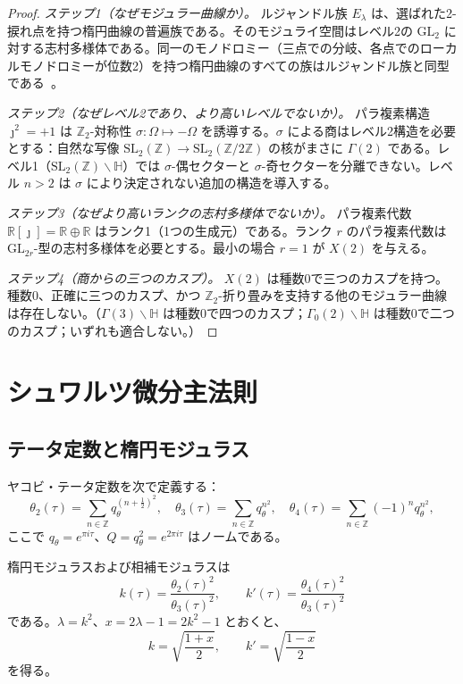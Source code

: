 \documentclass[12pt]{article}
\theoremstyle{plain}
\theoremstyle{definition}
\numberwithin{equation}{section}
\newcommand{\R}{\mathbb{R}}
\newcommand{\Z}{\mathbb{Z}}
\newcommand{\HH}{\mathbb{H}}
\begin{document}
\begin{proof}
\emph{ステップ1（なぜモジュラー曲線か）。} ルジャンドル族 $E_\lambda$ は、選ばれた2-捩れ点を持つ楕円曲線の普遍族である。そのモジュライ空間はレベル2の $\mathrm{GL}_2$ に対する志村多様体である。同一のモノドロミー（三点での分岐、各点でのローカルモノドロミーが位数2）を持つ楕円曲線のすべての族はルジャンドル族と同型である~\cite{Serre}。

\emph{ステップ2（なぜレベル2であり、より高いレベルでないか）。} パラ複素構造 $\jmath^2=+1$ は $\Z_2$-対称性 $\sigma:\Omega\mapsto-\Omega$ を誘導する。$\sigma$ による商はレベル2構造を必要とする：自然な写像 $\mathrm{SL}_2(\Z)\to\mathrm{SL}_2(\Z/2\Z)$ の核がまさに $\Gamma(2)$ である。レベル1（$\mathrm{SL}_2(\Z)\backslash\HH$）では $\sigma$-偶セクターと $\sigma$-奇セクターを分離できない。レベル $n>2$ は $\sigma$ により決定されない追加の構造を導入する。

\emph{ステップ3（なぜより高いランクの志村多様体でないか）。} パラ複素代数 $\R[\jmath]=\R\oplus\R$ はランク1（1つの生成元）である。ランク $r$ のパラ複素代数は $\mathrm{GL}_{2r}$-型の志村多様体を必要とする。最小の場合 $r=1$ が $X(2)$ を与える。

\emph{ステップ4（商からの三つのカスプ）。} $X(2)$ は種数0で三つのカスプを持つ。種数0、正確に三つのカスプ、かつ $\Z_2$-折り畳みを支持する他のモジュラー曲線は存在しない。（$\Gamma(3)\backslash\HH$ は種数0で四つのカスプ；$\Gamma_0(2)\backslash\HH$ は種数0で二つのカスプ；いずれも適合しない。）
\end{proof}

\section{シュワルツ微分主法則}\label{sec:schwarzian}

\subsection{テータ定数と楕円モジュラス}

ヤコビ・テータ定数を次で定義する：
\begin{equation}
\theta_2(\tau) = \sum_{n\in\Z} q_\theta^{(n+\frac{1}{2})^2},\quad
\theta_3(\tau) = \sum_{n\in\Z} q_\theta^{n^2},\quad
\theta_4(\tau) = \sum_{n\in\Z} (-1)^n q_\theta^{n^2},
\end{equation}
ここで $q_\theta=e^{\pi i\tau}$、$Q=q_\theta^2=e^{2\pi i\tau}$ はノームである。

楕円モジュラスおよび相補モジュラスは
\begin{equation}
k(\tau) = \frac{\theta_2(\tau)^2}{\theta_3(\tau)^2},\qquad
k'(\tau) = \frac{\theta_4(\tau)^2}{\theta_3(\tau)^2}
\end{equation}
である。$\lambda=k^2$、$x=2\lambda-1=2k^2-1$ とおくと、
\begin{equation}
k = \sqrt{\frac{1+x}{2}},\qquad k' = \sqrt{\frac{1-x}{2}}
\end{equation}
を得る。
\end{document}
